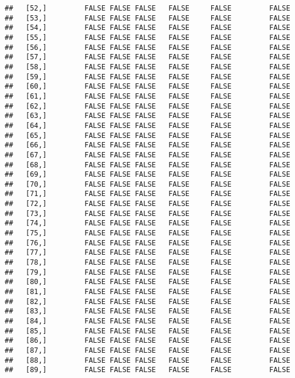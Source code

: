 \documentclass[
]{article}
\begin{document}
\begin{verbatim}
##   [52,]         FALSE FALSE FALSE   FALSE     FALSE         FALSE
##   [53,]         FALSE FALSE FALSE   FALSE     FALSE         FALSE
##   [54,]         FALSE FALSE FALSE   FALSE     FALSE         FALSE
##   [55,]         FALSE FALSE FALSE   FALSE     FALSE         FALSE
##   [56,]         FALSE FALSE FALSE   FALSE     FALSE         FALSE
##   [57,]         FALSE FALSE FALSE   FALSE     FALSE         FALSE
##   [58,]         FALSE FALSE FALSE   FALSE     FALSE         FALSE
##   [59,]         FALSE FALSE FALSE   FALSE     FALSE         FALSE
##   [60,]         FALSE FALSE FALSE   FALSE     FALSE         FALSE
##   [61,]         FALSE FALSE FALSE   FALSE     FALSE         FALSE
##   [62,]         FALSE FALSE FALSE   FALSE     FALSE         FALSE
##   [63,]         FALSE FALSE FALSE   FALSE     FALSE         FALSE
##   [64,]         FALSE FALSE FALSE   FALSE     FALSE         FALSE
##   [65,]         FALSE FALSE FALSE   FALSE     FALSE         FALSE
##   [66,]         FALSE FALSE FALSE   FALSE     FALSE         FALSE
##   [67,]         FALSE FALSE FALSE   FALSE     FALSE         FALSE
##   [68,]         FALSE FALSE FALSE   FALSE     FALSE         FALSE
##   [69,]         FALSE FALSE FALSE   FALSE     FALSE         FALSE
##   [70,]         FALSE FALSE FALSE   FALSE     FALSE         FALSE
##   [71,]         FALSE FALSE FALSE   FALSE     FALSE         FALSE
##   [72,]         FALSE FALSE FALSE   FALSE     FALSE         FALSE
##   [73,]         FALSE FALSE FALSE   FALSE     FALSE         FALSE
##   [74,]         FALSE FALSE FALSE   FALSE     FALSE         FALSE
##   [75,]         FALSE FALSE FALSE   FALSE     FALSE         FALSE
##   [76,]         FALSE FALSE FALSE   FALSE     FALSE         FALSE
##   [77,]         FALSE FALSE FALSE   FALSE     FALSE         FALSE
##   [78,]         FALSE FALSE FALSE   FALSE     FALSE         FALSE
##   [79,]         FALSE FALSE FALSE   FALSE     FALSE         FALSE
##   [80,]         FALSE FALSE FALSE   FALSE     FALSE         FALSE
##   [81,]         FALSE FALSE FALSE   FALSE     FALSE         FALSE
##   [82,]         FALSE FALSE FALSE   FALSE     FALSE         FALSE
##   [83,]         FALSE FALSE FALSE   FALSE     FALSE         FALSE
##   [84,]         FALSE FALSE FALSE   FALSE     FALSE         FALSE
##   [85,]         FALSE FALSE FALSE   FALSE     FALSE         FALSE
##   [86,]         FALSE FALSE FALSE   FALSE     FALSE         FALSE
##   [87,]         FALSE FALSE FALSE   FALSE     FALSE         FALSE
##   [88,]         FALSE FALSE FALSE   FALSE     FALSE         FALSE
##   [89,]         FALSE FALSE FALSE   FALSE     FALSE         FALSE

\end{verbatim}
\end{document}
